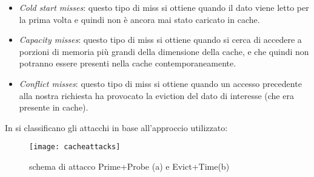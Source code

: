 			\begin{itemize}
				\item \emph{Cold start misses}: questo tipo di miss si ottiene quando il dato viene letto per la prima volta e quindi non è ancora mai stato caricato in cache.
				\item \emph{Capacity misses}: questo tipo di miss si ottiene quando si cerca di accedere a porzioni di memoria più grandi della dimensione della cache, e che quindi non potranno essere presenti nella cache contemporaneamente.
				\item \emph{Conflict misses}: questo tipo di miss si ottiene quando un accesso precedente alla nostra richiesta ha provocato la eviction del dato di interesse (che era presente in cache).
			\end{itemize}
			
			In \cite{lipp2016armageddon,ge2016survey} si classificano gli attacchi in base all'approccio utilizzato:
			
			\begin{figure}
				\begin{center}
					\texttt{[image: cacheattacks]}
					\caption{schema di attacco Prime+Probe (a) e Evict+Time(b)}
					\label{fig:cacheattacks}
				\end{center}
			\end{figure}
			
